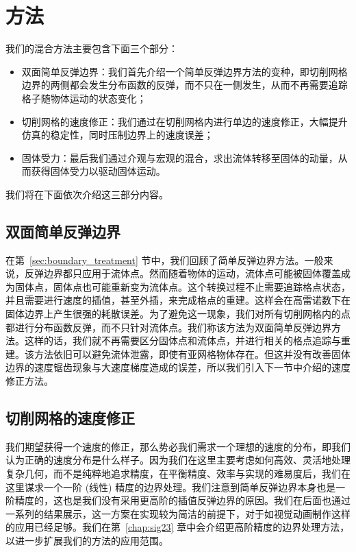 \section{方法}
我们的混合方法主要包含下面三个部分：
\begin{itemize}
\item 双面简单反弹边界：我们首先介绍一个简单反弹边界方法的变种，即切削网格边界的两侧都会发生分布函数的反弹，而不只在一侧发生，从而不再需要追踪格子随物体运动的状态变化；
\item 切削网格的速度修正：我们通过在切削网格内进行单边的速度修正，大幅提升仿真的稳定性，同时压制边界上的速度误差；
\item 固体受力：最后我们通过介观与宏观的混合，求出流体转移至固体的动量，从而获得固体受力以驱动固体运动。
\end{itemize}

我们将在下面依次介绍这三部分内容。

\subsection{双面简单反弹边界}
在第~\ref{sec:boundary_treatment} 节中，我们回顾了简单反弹边界方法。一般来说，反弹边界都只应用于流体点。然而随着物体的运动，流体点可能被固体覆盖成为固体点，固体点也可能重新变为流体点。这个转换过程不止需要追踪格点状态，并且需要进行速度的插值，甚至外插，来完成格点的重建。这样会在高雷诺数下在固体边界上产生很强的耗散误差。为了避免这一现象，我们对所有切削网格内的点都进行分布函数反弹，而不只针对流体点。我们称该方法为双面简单反弹边界方法。这样的话，我们就不再需要区分固体点和流体点，并进行相关的格点追踪与重建。该方法依旧可以避免流体泄露，即使有亚网格物体存在。但这并没有改善固体边界的速度锯齿现象与大速度梯度造成的误差，所以我们引入下一节中介绍的速度修正方法。

\subsection{切削网格的速度修正}
我们期望获得一个速度的修正，那么势必我们需求一个理想的速度的分布，即我们认为正确的速度分布是什么样子。因为我们在这里主要考虑如何高效、灵活地处理复杂几何，而不是纯粹地追求精度，在平衡精度、效率与实现的难易度后，我们在这里谋求一个一阶 (线性) 精度的边界处理。我们注意到简单反弹边界本身也是一阶精度的，这也是我们没有采用更高阶的插值反弹边界的原因。我们在后面也通过一系列的结果展示，这一方案在实现较为简洁的前提下，对于如视觉动画制作这样的应用已经足够。我们在第~\ref{chap:sig23} 章中会介绍更高阶精度的边界处理方法，以进一步扩展我们的方法的应用范围。

